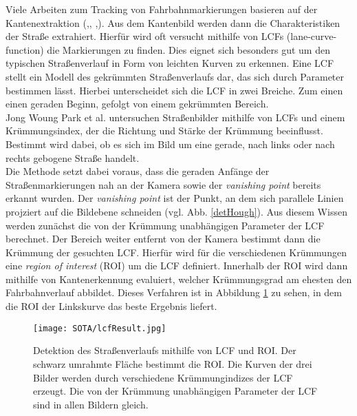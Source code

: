 Viele Arbeiten zum Tracking von Fahrbahnmarkierungen basieren auf der Kantenextraktion (\cite{Voisin2005},\cite{bai2010multiple}, \cite{Park20032301},\cite{wang2004lane}). Aus dem Kantenbild werden dann die Charakteristiken der Straße extrahiert.
Hierfür wird oft versucht mithilfe von LCFs (lane-curve-function) die Markierungen zu finden. Dies eignet sich besonders gut um den typischen Straßenverlauf in Form von leichten Kurven zu erkennen. Eine LCF stellt ein Modell des gekrümmten Straßenverlaufs dar, das sich durch Parameter bestimmen lässt. Hierbei unterscheidet sich die LCF in zwei Breiche. Zum einen einen geraden Beginn, gefolgt von einem gekrümmten Bereich.\\
Jong Woung Park et al.\cite{Park20032301} untersuchen Straßenbilder mithilfe von LCFs und einem Krümmungsindex, der die Richtung und Stärke der Krümmung beeinflusst. Bestimmt wird dabei, ob es sich im Bild um eine gerade, nach links oder nach rechts gebogene Straße handelt.\\
Die Methode setzt dabei voraus, dass die geraden Anfänge der Straßenmarkierungen nah an der Kamera sowie der \textit{vanishing point} bereits erkannt wurden. Der \textit{vanishing point} ist der Punkt, an dem sich parallele Linien projziert auf die Bildebene schneiden (vgl. Abb. \ref{detHough}). Aus diesem Wissen werden zunächst die von der Krümmung unabhängigen Parameter der LCF berechnet. Der Bereich weiter entfernt von der Kamera bestimmt dann die Krümmung der gesuchten LCF. Hierfür wird für die verschiedenen Krümmungen eine \textit{region of interest} (ROI) um die LCF definiert. Innerhalb der ROI wird dann mithilfe von Kantenerkennung evaluiert, welcher Krümmungsgrad am ehesten den Fahrbahnverlauf abbildet. Dieses Verfahren ist in Abbildung \ref{lcfDec} zu sehen, in dem die ROI der Linkskurve das beste Ergebnis liefert.
\begin{figure}[H]
	\centering
	\texttt{[image: SOTA/lcfResult.jpg]}
	\caption{Detektion des Straßenverlaufs mithilfe von LCF und ROI. Der schwarz umrahmte Fläche bestimmt die ROI. Die Kurven der drei Bilder werden durch verschiedene Krümmungindizes der LCF erzeugt. Die von der Krümmung unabhängigen Parameter der LCF sind in allen Bildern gleich.}
	\label{lcfDec}
\end{figure}

